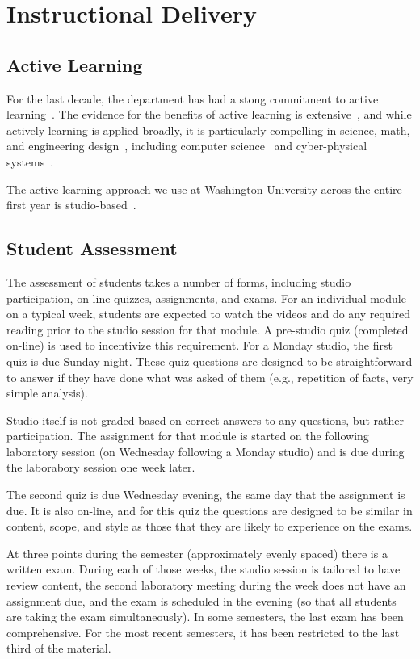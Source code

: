 \section{Instructional Delivery}
\label{sec:delivery}

\subsection{Active Learning}

For the last decade, the department has had a stong commitment to
active learning~\cite{scbggg10,sgcggt10}.
The evidence for the benefits of active learning is
extensive~\cite{jjs98,lst99,Prince04,rss97},
and while actively learning is applied broadly, it is particularly
compelling in science, math, and engineering
design~\cite{Freeman14,lst99,Hake98,Byerley01,kb06}, including computer
science~\cite{McConnell96,tlb01,skltc10,ag13}
and cyber-physical systems~\cite{me14,mmy16}.

The active learning approach we use at Washington University across the entire
first year is studio-based~\cite{hnc08}.

\subsection{Student Assessment}

The assessment of students takes a number of forms, including studio
participation, on-line quizzes, assignments, and exams.
For an individual module on a typical week,
students are expected to watch the videos
and do any required reading prior to the studio session for that module.
A pre-studio quiz (completed on-line) is used to incentivize this
requirement.  For a Monday studio, the first quiz is due Sunday night.
These quiz questions are designed to be straightforward to answer if
they have done what was asked of them (e.g., repetition of facts,
very simple analysis).

Studio itself is not graded based on correct answers to any questions, but
rather participation. The assignment for that module is started on the
following laboratory session (on Wednesday following a Monday studio)
and is due during the laborabory session one week later.

The second quiz is due Wednesday evening, the same day that the assignment
is due. It is also on-line, and for this quiz the questions are designed
to be similar in content, scope, and style as those that they are likely to
experience on the exams. 

At three points during the semester (approximately evenly spaced) there
is a written exam.  During each of those weeks, the
studio session is tailored to have review content, the second laboratory
meeting during the week does not have an assignment due, and the
exam is scheduled in the evening (so that all students are taking the
exam simultaneously).
In some semesters, the last exam has been comprehensive.  For the most
recent semesters, it has been restricted to the last third of the material.
